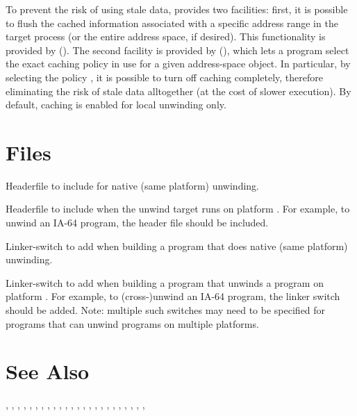 \documentclass{article}
\begin{document}
To prevent the risk of using stale data,  provides two
facilities: first, it is possible to flush the cached information
associated with a specific address range in the target process (or the
entire address space, if desired).  This functionality is provided by
().  The second facility is provided by
(), which lets a program
select the exact caching policy in use for a given address-space
object.  In particular, by selecting the policy
, it is possible to turn off caching
completely, therefore eliminating the risk of stale data alltogether
(at the cost of slower execution).  By default, caching is enabled for
local unwinding only.


\section{Files}

\begin{Description}
\item[\File{libunwind.h}] Headerfile to include for native (same
  platform) unwinding.
\item[\File{libunwind-}\Var{PLAT}\File{.h}] Headerfile to include when
  the unwind target runs on platform .  For example, to unwind
  an IA-64 program, the header file  should be
  included.
\item[\Opt{-l}\File{unwind}] Linker-switch to add when building a
  program that does native (same platform) unwinding.
\item[\Opt{-l}\File{unwind-}\Var{PLAT}] Linker-switch to add when
  building a program that unwinds a program on platform .
  For example, to (cross-)unwind an IA-64 program, the linker switch
   should be added.  Note: multiple such switches
  may need to be specified for programs that can unwind programs on
  multiple platforms.
\end{Description}

\section{See Also}

,
,
,
,
,
,
,
,
,
,
,
,
,
,
,
,
,
,
,
,
,
,
,
,
\end{document}

